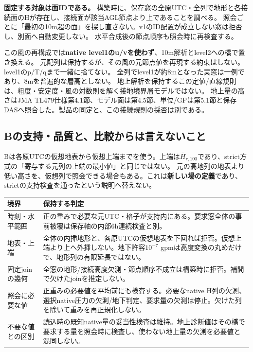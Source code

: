 \documentclass[11pt,a4paper]{article}
\begin{document}
\textbf{固定する対象は面IDである。} 構築時に、保存窓の全原UTC・全列で地形と各接続面のHが存在し、接続面が該当AGL節点より上であることを調べる。
照会ごとに「最初の10m超の面」を探し直さない。v1のID配置が成立しない窓は拒否し、別面へ自動変更しない。
水平合成後の節点順序も照会時に再検査する。

この風の再構成では\textbf{native level1のu/vを使わず}、10m解析とlevel2への橋で置き換える。
元配列は保持するが、その風の元節点値を再現する約束はしない。level1のp/T/qまで一緒に捨てない。
全列でlevel1が約8mとなった実窓は一例であり、8mを普遍的な層高としない。
地上解析を保持するこの定値/直線規則は、粗度・安定度・風の対数則を解く接地境界層モデルではない。
地上量の高さはJMA TL479仕様第4.1節、モデル面は第4.5節、単位/GPは第5.1節と保存DASへ照合した。製品の同定と、この接続規則の採否は別である。

\clearpage
\subsection{Bの支持・品質と、比較からは言えないこと}\label{th:jra-b-limits}
Bは各原UTCの仮想地表から仮想上端までを使う。上端は$\bar H_{r,100}$であり、strict方式の「寄与する元列の上端の最小値」と同じではない。
元の高地列の地表より低い高さを、仮想列で照会できる場合もある。これは\textbf{新しい場の定義}であり、strictの支持検査を通ったという説明へ替えない。

\begin{longtable}{@{}p{36mm}p{116mm}@{}}
\toprule 境界 & 保持する判定 \\\midrule\endhead
時刻・水平範囲 & 正の重みで必要な元UTC・格子が支持内にある。要求窓全体の事前被覆は保存軸の内部6h連続検査と別。 \\
地表・上端 & 全体の内挿地形と、各原UTCの仮想地表を下回れば拒否。仮想上端より上へ外挿しない。地下許容$10^{-7}$ gpmは高度変換の丸めだけで、地形列の有限延長ではない。 \\
固定joinの幾何 & 全窓の地形/接続高度欠測・節点順序不成立は構築時に拒否。補間で欠けたjoinを推定しない。 \\
照会に必要な値 & 正重みの必要値を平均前にも検査する。必要なnative H列の欠測、選択native圧力の欠測/地下判定、要求量の欠測は停止。欠けた列を除いて重みを再正規化しない。 \\
不要な値との区別 & 読込時の既知native量の妥当性検査は維持。地上診断値はその橋で要求する量を照会時に検査し、使わない地上量の欠測を必要値と混同しない。 \\\bottomrule
\end{longtable}
\end{document}
